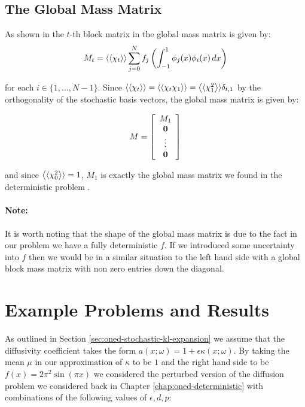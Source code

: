 \subsection{The Global Mass Matrix}

As shown in  the $t$-th block matrix in the
global mass matrix is given by:
\begin{equation}
    M_t = \left\langle\langle\chi_t\right\rangle\rangle\sum_{j=0}^Nf_j\left(
        \int_{-1}^1\phi_j(x)\phi_i(x)\, dx\right)
\end{equation}

for each $i \in \{1,\ldots,N-1\}$. Since $\left\langle\langle\chi_t\right\rangle\rangle =
\left\langle\langle\chi_t\chi_1\right\rangle\rangle = \left\langle\langle\chi_1^2\right\rangle\rangle\delta_{t, 1}$ by the orthogonality of
the stochastic basis vectors, the global mass matrix is given by:

\begin{equation}
    M = \left[\begin{array}{c}
        M_1 \\ \mathbf{0} \\ \vdots \\ \mathbf{0}
    \end{array}\right]
\end{equation}

and since $\left\langle\langle\chi_0^2\right\rangle\rangle = 1$, $M_1$ is exactly the global mass matrix we
found in the deterministic problem .

\paragraph{Note:}

It is worth noting that the shape of the global mass matrix is due to the fact
in our problem we have a fully deterministic $f$. If we introduced some
uncertainty into $f$ then we would be in a similar situation to the left hand
side with a global block mass matrix with non zero entries down the diagonal.

\section{Example Problems and Results}

As outlined in Section \ref{sec:oned-stochastic-kl-expansion} we assume that
the diffusivity coefficient takes the form $a(x;\omega) = 1 +
\epsilon\kappa(x;\omega)$. By taking the mean $\mu$ in our approximation of
$\kappa$ to be $1$ and the right hand side to be $f(x) = 2\pi^2\sin{(\pi x)}$
we considered the perturbed version of the diffusion problem we considered back
in Chapter \ref{chap:oned-deterministic} with combinations of the following
values of $\epsilon, d, p$:

